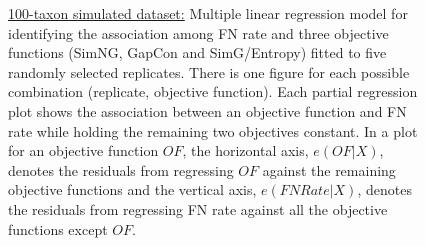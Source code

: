 \begin{figure}[!htbp]
\begin{adjustwidth}{-1cm}{-1cm}
\begin{tabular}{l||C{0.24\textwidth}|C{0.24\textwidth}|C{0.24\textwidth}|C{0.24\textwidth} }
			 & 
			 & 
			\\\hline
		\end{tabular}	
		\caption{\underline{100-taxon simulated dataset:} Multiple linear regression model for identifying the association among FN rate and three objective functions (SimNG, GapCon and SimG/Entropy) fitted to five randomly selected replicates. There is one figure for each possible combination (replicate, objective function). Each partial regression plot shows the association between an objective function and FN rate while holding the remaining two objectives constant.  In a plot for an objective function $ OF $, the horizontal axis, $e(OF|X)$, denotes the residuals from regressing $OF$ against the remaining objective functions and the vertical axis, $e(FNRate|X)$, denotes the residuals from regressing FN rate against all the objective functions except $ OF $.}
		\label{fig:new_mul_lin_reg}
	\end{adjustwidth}
\end{figure}
\clearpage
